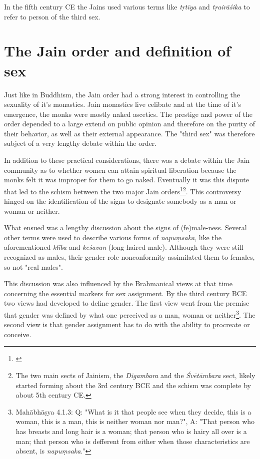 In the fifth century CE the Jains used various terms like {\em tṛtīya} and {\em tṛairāśika} to refer to person of the third sex. 

\section{The Jain order and definition of sex}
Just like in Buddhism, the Jain order had a strong interest in controlling the sexuality of it's monastics. Jain monastics live celibate and at the time of it's emergence, the monks were mostly naked ascetics. The prestige and power of the order depended to a large extend on public opinion and therefore on the purity of their behavior, as well as their external appearance. The "third sex" was therefore subject of a very lengthy debate within the order. 

In addition to these practical considerations, there was a debate within the Jain community as to whether women can attain spiritual liberation because the monks felt it was improper for them to go naked. Eventually it was this dispute that led to the schism between the two major Jain orders\footnote{\cite{dudas}}\footnote{The two main sects of Jainism, the {\em Digambara} and the {\em Śvētāmbara} sect, likely started forming about the 3rd century BCE and the schism was complete by about 5th century CE.}. This controversy hinged on the identification of the signs to designate somebody as a man or woman or neither. 

What ensued was a lengthy discussion about the signs of (fe)male-ness. Several other terms were used to describe various forms of {\em napuṃsaka}, like the aforementioned {\em klība} and {\em keśavan} (long-haired male). Although they were still recognized as males, their gender role nonconformity assimilated them to females, so not "real males". 

This discussion was also influenced by the Brahmanical views at that time concerning the essential markers for sex assignment. By the third century BCE two views had developed to define gender. The first view went from the premise that gender was defined by what one perceived as a man, woman or neither\footnote{Mahābhāṣya 4.1.3: Q: "What is it that people see when they decide, this is a woman, this is a man, this is neither woman nor man?", A: "That person who has breasts and long hair is a woman; that person who is hairy all over is a man; that person who is defferent from either when those characteristics are absent, is {\em napuṃsaka}."}. The second view is that gender assignment has to do with the ability to procreate or conceive. 

